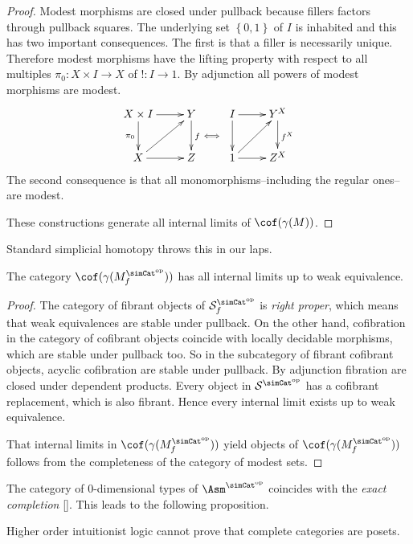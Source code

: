 \documentclass{tac}
\newcommand\cat\mathcal
\newcommand\set[1]{\left\{#1\right\}}
\newcommand\dual{^{\mathrm{op}}}
\newcommand\s{^{\simCat\dual}}
\newcommand\bang{!}
\newcommand\of{:}
\newcommand\f{_f}
\newcommand\gen\gamma
\newcommand\citep[1]{[\cite{#1}]}
\begin{document}
\begin{proof} Modest morphisms are closed under pullback because fillers factors through pullback squares.
The underlying set $\set{0,1}$ of $I$ is inhabited and this has two important consequences. The first is that a filler is necessarily unique. Therefore modest morphisms have the lifting property with respect to all multiples $\pi_0\of X\times I\to X$ of $\bang\of I\to 1$. By adjunction all powers of modest morphisms are modest. 
\[\xymatrix{
X\times I\ar[d]_{\pi_0}\ar[r] & Y\ar[d]^f & I\ar[r]\ar[d] & Y^X\ar[d]^{f^X} \\
X\ar[r]\ar[ur] & Z\ar@{}[ur]|\iff & 1\ar[r]\ar[ur] & Z^X
}\]
The second consequence is that all monomorphisms--including the regular ones--are modest.

These constructions generate all internal limits of $\cof(\gen(M))$.
\end{proof}

Standard simplicial homotopy throws this in our laps.

\begin{proposition} The category $\cof(\gen(M\s\f))$ has all internal limits up to weak equivalence.\label{completeness} \end{proposition}

\begin{proof} The category of fibrant objects of $\cat S\s\f$ is \emph{right proper}, which means that weak equivalences are stable under pullback. On the other hand, cofibration in the category of cofibrant objects coincide with locally decidable morphisms, which are stable under pullback too. So in the subcategory of fibrant cofibrant objects, acyclic cofibration are stable under pullback. By adjunction fibration are closed under dependent products. Every object in $\cat S\s$ has a cofibrant replacement, which is also fibrant. Hence every internal limit exists up to weak equivalence.

That internal limits in $\cof(\gen(M\s\f))$ yield objects of $\cof(\gen(M\s\f))$ follows from the completeness of the category of modest sets.
\end{proof}

The category of 0-dimensional types of $\Asm\s$ coincides with the \emph{exact completion} \citep{MR1600009}. This leads to the following proposition.

\begin{proposition} Higher order intuitionist logic cannot prove that complete categories are posets.\label{consistency} \end{proposition}
\end{document}
